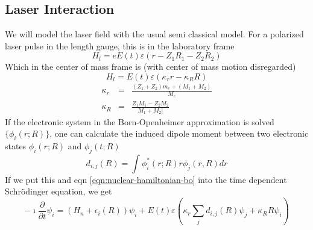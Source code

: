 \documentclass[a4paper]{article}
\begin{document}
\subsection{Laser Interaction}
We will model the laser field with the usual semi classical model. For a polarized laser pulse in 
the length gauge, this is in the laboratory frame
\begin{equation}
 H_l = e E(t) \varepsilon ( r - Z_1 R_1 - Z_2 R_2)
\end{equation}
Which in the center of mass frame is (with center of mass motion disregarded)
\begin{equation}
 H_l = E(t) \varepsilon ( \kappa_r r - \kappa_R R )
\end{equation}
\begin{eqnarray}
	\kappa_r &=& \frac{(Z_1 + Z_2) m_e + (M_1 + M_2)}{M_c} \\
	\kappa_R &=& \frac{Z_1 M_1 - Z_2 M_2}{M_1 + M_2]}
\end{eqnarray}
If the electronic system in the Born-Openheimer approximation is solved $\{ \phi_i(r; R) \}$, one can calculate the induced dipole moment 
between two electronic states $\phi_i(r; R)$ and $\phi_j(t; R)$
\begin{equation}
	d_{i,j}(R) = \int \phi_i^*(r; R) r \phi_j(r, R) dr
\end{equation}
If we put this and eqn \ref{eqn:nuclear-hamiltonian-bo} into the time dependent Schrödinger equation, we get
\begin{equation}
	\label{eqn:nuclear-hamiltonian-laser}
 - \imath \frac{\partial}{\partial t} \psi_i = \left( H_n + \epsilon_i(R) \right) \psi_i + E(t) \varepsilon \left( \kappa_r \sum_j d_{i, j}(R) \psi_j + \kappa_R R \psi_i\right)
\end{equation}
\end{document}
